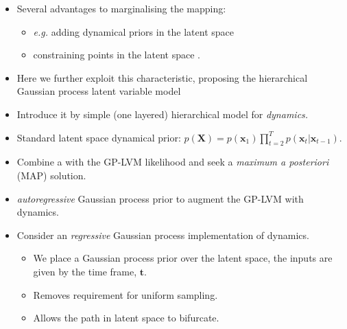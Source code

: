 \documentclass[english,color,smalltitle]{manchesterposter}
\begin{document}
\begin{multicols}{5}{\LARGE \par}
\begin{columnbox}
\-


\begin{itemize}
\item Several advantages to marginalising the mapping:{\large \par}

\begin{itemize}
\item \emph{e.g.} adding dynamical priors in the latent space \citep{Wang:gpdm05,Urtasun:3dpeople06} {\large \par}
\item constraining points in the latent space \citep{Lawrence:backconstraints06}. {\large \par}
\end{itemize}
\item Here we further exploit this characteristic, proposing the hierarchical
Gaussian process latent variable model{\large \par}
\item Introduce it by simple (one layered) hierarchical model for \emph{dynamics.} {\large \par}
\end{itemize}
\end{columnbox}


\begin{columnbox}
\-


\begin{itemize}
\item Standard latent space dynamical prior: $p\left(\mathbf{X}\right)=p\left(\mathbf{x}_{1}\right)\prod_{t=2}^{T}p\left(\mathbf{x}_{t}|\mathbf{x}_{t-1}\right)$. {\large \par}
\item Combine a with the GP-LVM likelihood and seek a \emph{maximum a posteriori}
(MAP) solution.{\large \par}
\item \citet{Wang:gpdm05} \emph{autoregressive} Gaussian process prior
to augment the GP-LVM with dynamics. {\large \par}
\item Consider an \emph{regressive} Gaussian process implementation of dynamics.{\large \par}

\begin{itemize}
\item We place a Gaussian process prior over the latent space, the inputs
are given by the time frame, $\mathbf{t}$. {\large \par}
\item Removes requirement for uniform sampling.{\large \par}
\item Allows the path in latent space to bifurcate.{\large \par}
\end{itemize}
\end{itemize}
\end{columnbox}



\end{multicols}
\end{document}
